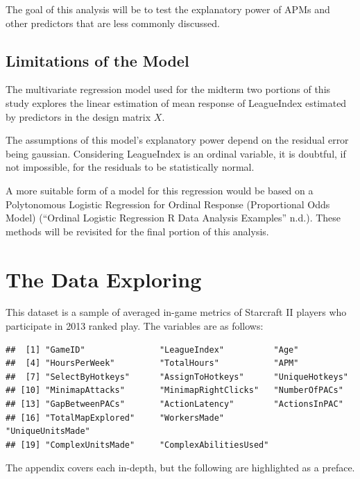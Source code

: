 \documentclass[]{article}
\begin{document}
The goal of this analysis will be to test the explanatory power of APMs
and other predictors that are less commonly discussed.

\hypertarget{limitations-of-the-model}{%
\subsection{Limitations of the Model}\label{limitations-of-the-model}}

The multivariate regression model used for the midterm two portions of
this study explores the linear estimation of mean response of
LeagueIndex estimated by predictors in the design matrix \(X\).

The assumptions of this model's explanatory power depend on the residual
error being gaussian. Considering LeagueIndex is an ordinal variable, it
is doubtful, if not impossible, for the residuals to be statistically
normal.

A more suitable form of a model for this regression would be based on a
Polytonomous Logistic Regression for Ordinal Response (Proportional Odds
Model) (``Ordinal Logistic Regression \textbar{} R Data Analysis
Examples'' n.d.). These methods will be revisited for the final portion
of this analysis.

\hypertarget{the-data-exploring}{%
\section{The Data Exploring}\label{the-data-exploring}}

This dataset is a sample of averaged in-game metrics of Starcraft II
players who participate in 2013 ranked play. The variables are as
follows:

\begin{verbatim}
##  [1] "GameID"               "LeagueIndex"          "Age"                 
##  [4] "HoursPerWeek"         "TotalHours"           "APM"                 
##  [7] "SelectByHotkeys"      "AssignToHotkeys"      "UniqueHotkeys"       
## [10] "MinimapAttacks"       "MinimapRightClicks"   "NumberOfPACs"        
## [13] "GapBetweenPACs"       "ActionLatency"        "ActionsInPAC"        
## [16] "TotalMapExplored"     "WorkersMade"          "UniqueUnitsMade"     
## [19] "ComplexUnitsMade"     "ComplexAbilitiesUsed"
\end{verbatim}

The appendix covers each in-depth, but the following are highlighted as
a preface.
\end{document}
